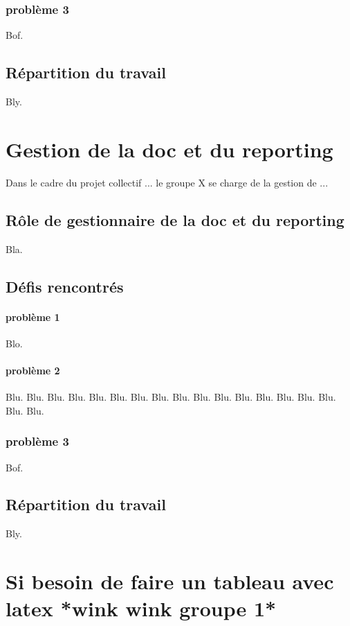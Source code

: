 \documentclass[12pt]{article}
\begin{document}
\subsubsection{problème 3}
Bof.

\subsection{Répartition du travail}
Bly.
    
\section{Gestion de la doc et du reporting}
Dans le cadre du projet collectif ... le groupe X se charge de la gestion de ...

\subsection{Rôle de gestionnaire de la doc et du reporting}
Bla.

\subsection{Défis rencontrés} %

\paragraph{problème 1 \\}
Blo.

\paragraph{problème 2}
Blu. Blu. Blu. Blu. Blu. Blu. Blu. Blu. Blu. Blu. Blu. Blu. Blu. Blu. Blu. Blu. Blu. Blu. 

\subsubsection{problème 3}
Bof.

\subsection{Répartition du travail}
Bly.

\section{Si besoin de faire un tableau avec latex *wink wink groupe 1*}
\end{document}
